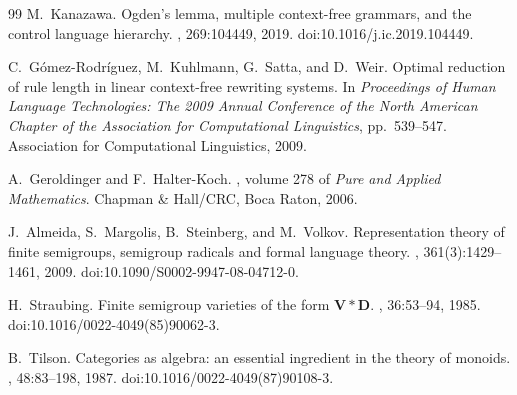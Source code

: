 \documentclass[11pt]{article}
\numberwithin{equation}{section}
\theoremstyle{plain}
\theoremstyle{definition}
\theoremstyle{remark}
\begin{document}
\begin{thebibliography}{99}
M.~Kanazawa.
\newblock Ogden's lemma, multiple context-free grammars, and the control language hierarchy.
, 269:104449, 2019.
\newblock doi:10.1016/j.ic.2019.104449.

C.~G\'omez-Rodr\'iguez, M.~Kuhlmann, G.~Satta, and D.~Weir.
\newblock Optimal reduction of rule length in linear context-free rewriting systems.
\newblock In {\em Proceedings of Human Language Technologies: The 2009 Annual
Conference of the North American Chapter of the Association for Computational
Linguistics}, pp.~539--547. Association for Computational Linguistics, 2009.

A.~Geroldinger and F.~Halter-Koch.
, volume 278 of {\em Pure and Applied Mathematics}.
\newblock Chapman \& Hall/CRC, Boca Raton, 2006.

J.~Almeida, S.~Margolis, B.~Steinberg, and M.~Volkov.
\newblock Representation theory of finite semigroups, semigroup radicals and
formal language theory.
,
361(3):1429--1461, 2009.
\newblock doi:10.1090/S0002-9947-08-04712-0.

H.~Straubing.
\newblock Finite semigroup varieties of the form $\mathbf V*\mathbf D$.
, 36:53--94, 1985.
\newblock doi:10.1016/0022-4049(85)90062-3.

B.~Tilson.
\newblock Categories as algebra: an essential ingredient in the theory of monoids.
, 48:83--198, 1987.
\newblock doi:10.1016/0022-4049(87)90108-3.

\end{thebibliography}
\normalsize
\end{document}

